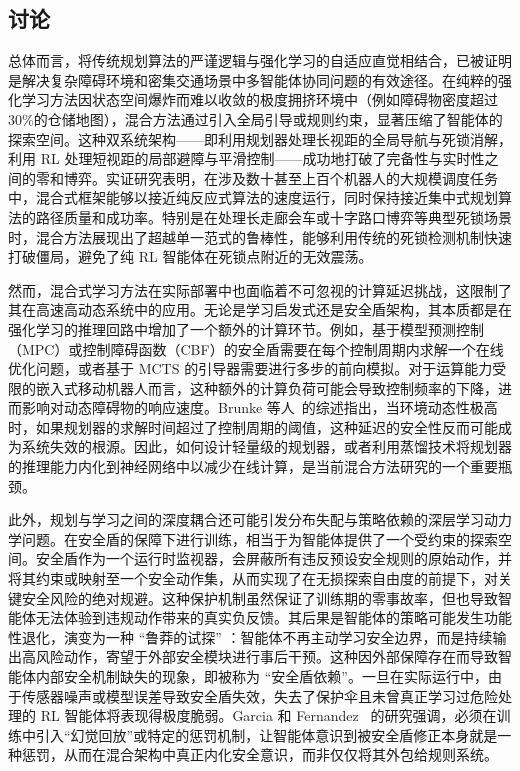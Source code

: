 \documentclass[13.5pt]{extarticle}
\begin{document}
\subsection{讨论}

总体而言，将传统规划算法的严谨逻辑与强化学习的自适应直觉相结合，已被证明是解决复杂障碍环境和密集交通场景中多智能体协同问题的有效途径。在纯粹的强化学习方法因状态空间爆炸而难以收敛的极度拥挤环境中（例如障碍物密度超过 30\%的仓储地图），混合方法通过引入全局引导或规则约束，显著压缩了智能体的探索空间。这种双系统架构——即利用规划器处理长视距的全局导航与死锁消解，利用 RL 处理短视距的局部避障与平滑控制——成功地打破了完备性与实时性之间的零和博弈。实证研究表明，在涉及数十甚至上百个机器人的大规模调度任务中，混合式框架能够以接近纯反应式算法的速度运行，同时保持接近集中式规划算法的路径质量和成功率。特别是在处理长走廊会车或十字路口博弈等典型死锁场景时，混合方法展现出了超越单一范式的鲁棒性，能够利用传统的死锁检测机制快速打破僵局，避免了纯 RL 智能体在死锁点附近的无效震荡。

然而，混合式学习方法在实际部署中也面临着不可忽视的计算延迟挑战，这限制了其在高速高动态系统中的应用。无论是学习启发式还是安全盾架构，其本质都是在强化学习的推理回路中增加了一个额外的计算环节。例如，基于模型预测控制（MPC）或控制障碍函数（CBF）的安全盾需要在每个控制周期内求解一个在线优化问题，或者基于 MCTS 的引导器需要进行多步的前向模拟。对于运算能力受限的嵌入式移动机器人而言，这种额外的计算负荷可能会导致控制频率的下降，进而影响对动态障碍物的响应速度。Brunke 等人~\cite{brunke2022safe}的综述指出，当环境动态性极高时，如果规划器的求解时间超过了控制周期的阈值，这种延迟的安全性反而可能成为系统失效的根源。因此，如何设计轻量级的规划器，或者利用蒸馏技术将规划器的推理能力内化到神经网络中以减少在线计算，是当前混合方法研究的一个重要瓶颈。

此外，规划与学习之间的深度耦合还可能引发分布失配与策略依赖的深层学习动力学问题。在安全盾的保障下进行训练，相当于为智能体提供了一个受约束的探索空间。安全盾作为一个运行时监视器，会屏蔽所有违反预设安全规则的原始动作，并将其约束或映射至一个安全动作集，从而实现了在无损探索自由度的前提下，对关键安全风险的绝对规避。这种保护机制虽然保证了训练期的零事故率，但也导致智能体无法体验到违规动作带来的真实负反馈。其后果是智能体的策略可能发生功能性退化，演变为一种 “鲁莽的试探” ：智能体不再主动学习安全边界，而是持续输出高风险动作，寄望于外部安全模块进行事后干预。这种因外部保障存在而导致智能体内部安全机制缺失的现象，即被称为 “安全盾依赖”。一旦在实际运行中，由于传感器噪声或模型误差导致安全盾失效，失去了保护伞且未曾真正学习过危险处理的 RL 智能体将表现得极度脆弱。Garcia 和 Fernandez~\cite{garcia2015comprehensive} 的研究强调，必须在训练中引入“幻觉回放”或特定的惩罚机制，让智能体意识到被安全盾修正本身就是一种惩罚，从而在混合架构中真正内化安全意识，而非仅仅将其外包给规则系统。
\end{document}
